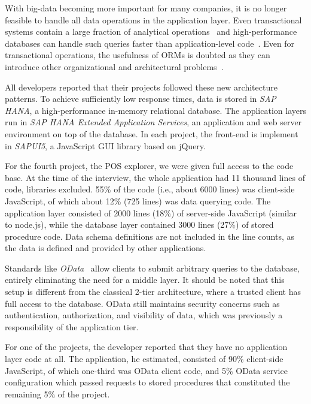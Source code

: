With big-data becoming more important for many companies, it is no longer feasible to handle all data operations in the application layer.
Even transactional systems contain a large fraction of analytical operations~\cite{krueger_10_a_case_for_online} and high-performance databases can handle such queries faster than application-level code~\cite{plattner_09_a_common_database_approach}.
Even for transactional operations, the usefulness of ORMs is doubted as they can introduce other organizational and architectural problems~\cite{neward_06_the_vietnam_of_computer}.

All developers reported that their projects followed these new architecture patterns.
To achieve sufficiently low response times, data is stored in \emph{SAP HANA}, a high-performance in-memory relational database.
The application layers run in \emph{SAP HANA Extended Application Services}, an application and web server environment on top of the database.
In each project, the front-end is implement in \emph{SAPUI5}, a JavaScript GUI library based on jQuery.

For the fourth project, the POS explorer, we were given full access to the code base.
At the time of the interview, the whole application had 11 thousand lines of code, libraries excluded.
55\% of the code (i.e., about 6000 lines) was client-side JavaScript, of which about 12\% (725 lines) was data querying code.
The application layer consisted of 2000 lines (18\%) of server-side JavaScript (similar to node.js), while the database layer contained 3000 lines (27\%) of stored procedure code.
Data schema definitions are not included in the line counts, as the data is defined and provided by other applications.

Standards like \emph{OData}~\cite{chappell_11_introducing_odata} allow clients to submit arbitrary queries to the database, entirely eliminating the need for a middle layer.
It should be noted that this setup is different from the classical 2-tier architecture, where a trusted client has full access to the database.
OData still maintains security concerns such as authentication, authorization, and visibility of data, which was previously a responsibility of the application tier.

For one of the projects, the developer reported that they have no application layer code at all.
The application, he estimated, consisted of 90\% client-side JavaScript, of which one-third was OData client code, and 5\% OData service configuration which passed requests to stored procedures that constituted the remaining 5\% of the project.

